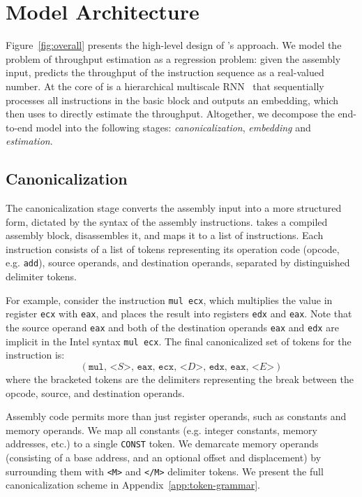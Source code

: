\section{Model Architecture}
\label{sec:model}

Figure~\ref{fig:overall} presents the high-level design of \tool{}'s approach.
We model the problem of throughput estimation as a regression problem: given the assembly input, \tool{} predicts the throughput of the instruction sequence as a real-valued number.
At the core of \tool{} is a hierarchical multiscale RNN~\cite{dag-rnn1, dag-rnn2} that sequentially processes all instructions in the basic block and outputs an embedding, which \tool{} then uses to directly estimate the throughput.
Altogether, we decompose the end-to-end model into the following stages: \emph{canonicalization}, \emph{embedding} and \emph{estimation}.

\subsection{Canonicalization}
\label{sec:canonicalization}

The canonicalization stage converts the assembly input into a more structured form, dictated by the syntax of the assembly instructions.
\tool{} takes a compiled assembly block, disassembles it, and maps it to a list of instructions.
Each instruction consists of a list of tokens representing its operation code (opcode, e.g. \texttt{add}), source operands, and destination operands, separated by distinguished delimiter tokens.

For example, consider the instruction \texttt{mul ecx}, which multiplies the value in register \texttt{ecx} with \texttt{eax}, and places the result into registers \texttt{edx} and \texttt{eax}.
Note that the source operand \texttt{eax} and both of the destination operands \texttt{eax} and \texttt{edx} are implicit in the Intel syntax \texttt{mul ecx}.
The final canonicalized set of tokens for the instruction is:
$$(\texttt{mul},\,\textit{<S>},\,\texttt{eax},\,\texttt{ecx},\,\textit{<D>},\,\texttt{edx},\,\texttt{eax},\,\textit{<E>})$$
where the bracketed tokens are the delimiters representing the break between the opcode, source, and destination operands.

Assembly code permits more than just register operands, such as constants and memory operands.
We map all constants (e.g. integer constants, memory addresses, etc.) to a single \texttt{CONST} token.
We demarcate memory operands (consisting of a base address, and an optional offset and displacement) by surrounding them with \texttt{<M>} and \texttt{</M>} delimiter tokens.
We present the full canonicalization scheme in Appendix~\ref{app:token-grammar}.

